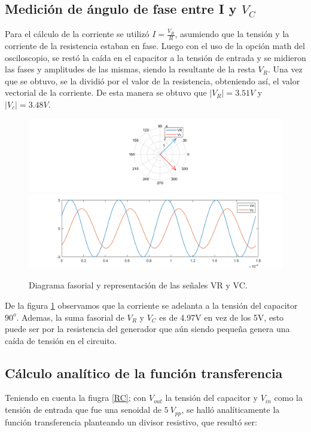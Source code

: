 \subsection{Medición de ángulo de fase entre I y $V_C$}

Para el cálculo de la corriente se utilizó $I=\frac{V_{R}}{R}$, asumiendo que la tensión y la corriente de la resistencia estaban en fase. 
Luego con el uso de la opción math del osciloscopio, se restó la caída en el capacitor a la tensión de entrada y se midieron las fases y amplitudes de las mismas, siendo la resultante de la resta $V_R$. Una vez que se obtuvo, se la dividió por el valor de la resistencia, obteniendo así, el valor vectorial de la corriente.
De esta manera se obtuvo que $|V_{R}|=3.51V$ y $|V_{c}|=3.48V$.

\begin{figure}[H]
\centering
\includegraphics[scale=0.5]{1-2.png}
\includegraphics[scale=0.5]{1-2b.png}
\caption{Diagrama fasorial y representación de las señales VR y VC.}
\label{diagfasorial}
\end{figure}


De la figura \ref{diagfasorial} observamos que la corriente se adelanta a la tensión del capacitor $90^{o}$. Ademas, la suma fasorial de $V_R$ y $V_C$ es de 4.97V en vez de los 5V, esto puede ser por la resistencia del generador que aún siendo pequeña genera una caída de tensión en el circuito.

\subsection{Cálculo analítico de la función transferencia}

Teniendo en cuenta la fiugra \ref{RC}; con $V_{out}$ la tensión del capacitor y $V_{in}$ como la tensión de entrada que fue una senoidal de $5~V_{pp}$, se halló analíticamente la función transferencia planteando un divisor resistivo, que resultó ser:

